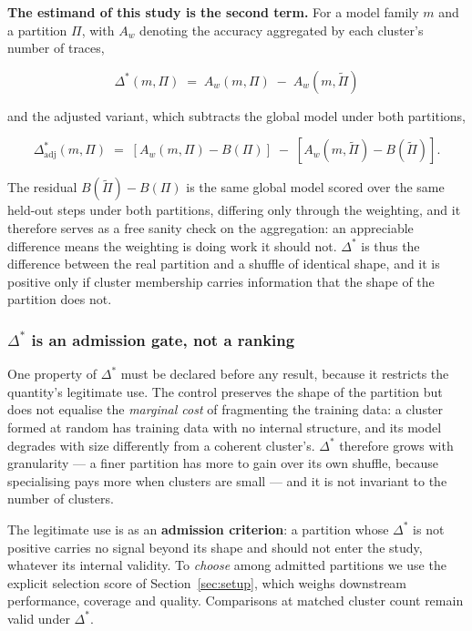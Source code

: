 \noindent \textbf{The estimand of this study is the second term.} For a model family $m$ and a
partition $\Pi$, with $A_w$ denoting the accuracy aggregated by each cluster's number of traces,

\[
\boxed{\;\Delta^{*}(m,\Pi) \;=\; A_w\!\left(m,\Pi\right) \;-\; A_w\!\left(m,\tilde{\Pi}\right)\;}
\]

\noindent and the adjusted variant, which subtracts the global model under both partitions,

\[
\Delta^{*}_{\mathrm{adj}}(m,\Pi) \;=\;
\left[A_w(m,\Pi) - B(\Pi)\right] \;-\; \left[A_w(m,\tilde{\Pi}) - B(\tilde{\Pi})\right] .
\]

\noindent The residual $B(\tilde{\Pi}) - B(\Pi)$ is the same global model scored over the same
held-out steps under both partitions, differing only through the weighting, and it therefore
serves as a free sanity check on the aggregation: an appreciable difference means the weighting is
doing work it should not. $\Delta^{*}$ is thus the difference between the real partition and a
shuffle of identical shape, and it is positive only if cluster membership carries information that
the shape of the partition does not.

\subsubsection*{\texorpdfstring{$\Delta^{*}$}{Delta-star} is an admission gate, not a ranking}

One property of $\Delta^{*}$ must be declared before any result, because it restricts the
quantity's legitimate use. The control preserves the shape of the partition but does not equalise
the \emph{marginal cost} of fragmenting the training data: a cluster formed at random has training
data with no internal structure, and its model degrades with size differently from a coherent
cluster's. $\Delta^{*}$ therefore grows with granularity --- a finer partition has more to gain
over its own shuffle, because specialising pays more when clusters are small --- and it is not
invariant to the number of clusters.

The legitimate use is as an \textbf{admission criterion}: a partition whose $\Delta^{*}$ is not
positive carries no signal beyond its shape and should not enter the study, whatever its internal
validity. To \emph{choose} among admitted partitions we use the explicit selection score of
Section~\ref{sec:setup}, which weighs downstream performance, coverage and quality. Comparisons at
matched cluster count remain valid under $\Delta^{*}$.

